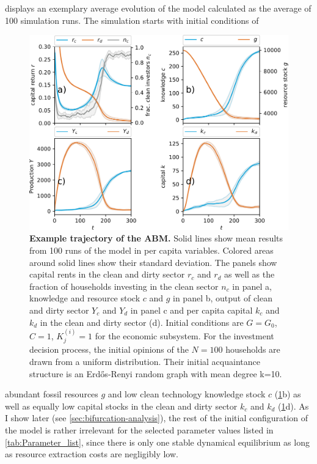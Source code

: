  displays an exemplary average evolution of the model calculated as the average of 100 simulation runs.
The simulation starts with initial conditions of 
\begin{figure}[H]
  \hspace{-.8 cm}\includegraphics[width=1.1\linewidth]{figures/example_trajectory_square_thesis.pdf}
  \caption{\textbf{Example trajectory of the ABM.} Solid lines show mean results from 100 runs of the model in per capita variables. Colored areas around solid lines show their standard deviation. The panels show capital rents in the clean and dirty sector $r_c$ and $r_d$ as well as the fraction of households investing in the clean sector $n_c$ in panel a, knowledge and resource stock $c$ and $g$ in panel b, output of clean and dirty sector $Y_c$ and $Y_d$ in panel c and per capita capital $k_c$ and $k_d$ in the clean and dirty sector (d).
Initial conditions are $G=G_0$, $C=1$, $K_j^{(i)}=1$ for the economic subsystem. For the investment decision process, the initial opinions of the $N=100$ households are drawn from a uniform distribution. Their initial acquaintance structure is an Erd\H{o}s-Renyi random graph with mean degree k=10.}
\label{fig:example_trajectory}
\end{figure}
abundant fossil resources $g$ and low clean technology knowledge stock $c$ (\cref{fig:example_trajectory}b) as well as equally low capital stocks in the clean and dirty sector $k_c$ and $k_d$ (\cref{fig:example_trajectory}d). As I show later (see \cref{sec:bifurcation-analysis}), the rest of the initial configuration of the model is rather irrelevant for the selected parameter values listed in \cref{tab:Parameter_list}, since there is only one stable dynamical equilibrium as long as resource extraction costs are negligibly low.
